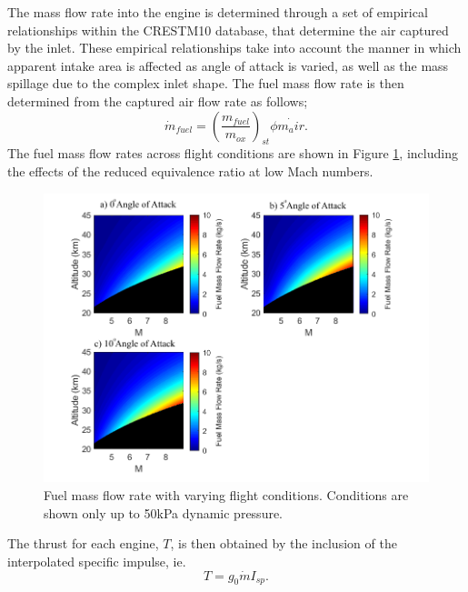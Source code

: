 The mass flow rate into the engine is determined through a set of empirical relationships within the \textsf{CRESTM10} database, that determine the air captured by the inlet. These empirical relationships take into account the manner in which apparent intake area is affected as angle of attack is varied, as well as the mass spillage due to the complex inlet shape. The fuel mass flow rate is then determined from the captured air flow rate as follows; 
\begin{equation}
\dot{m}_{fuel} = (\dfrac{m_{fuel}}{m_{ox}} )_{st} \phi \dot{m_air}.
\end{equation}
 The fuel mass flow rates across flight conditions are shown in Figure \ref{fig:FuelMassFlowStandard}, including the effects of the reduced equivalence ratio at low Mach numbers.


\begin{figure}[ht]
\centering
\includegraphics[width=0.85\linewidth]{figures/3_vehicle_design/FuelMassFlowStandard}
\caption{Fuel mass flow rate with varying flight conditions. Conditions are shown only up to 50kPa dynamic pressure.}
\label{fig:FuelMassFlowStandard}
\end{figure}
\noindent
The thrust for each engine, $T$, is then obtained by the inclusion of the interpolated specific impulse, ie. 
\begin{equation}
T = g_0\dot{m}I_{sp}. 
\end{equation}

